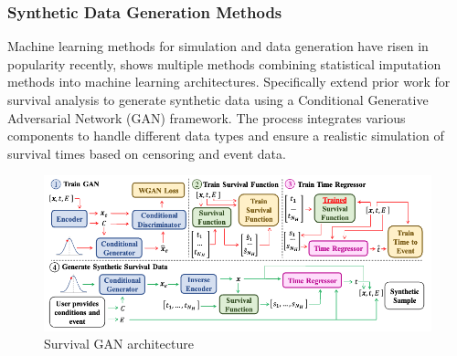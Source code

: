 \subsubsection{Synthetic Data Generation Methods}
Machine learning methods for simulation and data generation have risen in popularity recently, \parencite{norcliffe_survivalgan_2023} shows multiple methods combining statistical imputation methods into machine learning architectures. Specifically \parencite{norcliffe_survivalgan_2023} extend prior work for survival analysis to generate synthetic data using a Conditional Generative Adversarial Network (GAN) framework. The process integrates various components to handle different data types and ensure a realistic simulation of survival times based on censoring and event data.

\begin{figure}[h]
    \centering
    \includegraphics[scale=0.49]{Figures/GAN_ARCH.png}
    \caption{\parencite{norcliffe_survivalgan_2023} Survival GAN architecture}
\end{figure}
\pagebreak

